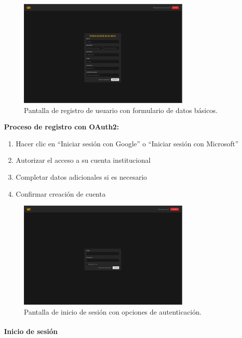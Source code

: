 \begin{figure}[H]
	\centering
	\includegraphics[width=0.75\textwidth]{images/pagina_web_registro.png}
	\caption{Pantalla de registro de usuario con formulario de datos básicos.}
	\label{fig:manual-registro}
\end{figure}

\textbf{Proceso de registro con OAuth2:}

\begin{enumerate}
	\item Hacer clic en ``Iniciar sesión con Google'' o ``Iniciar sesión con Microsoft''
	\item Autorizar el acceso a su cuenta institucional
	\item Completar datos adicionales si es necesario
	\item Confirmar creación de cuenta
\end{enumerate}

\begin{figure}[H]
	\centering
	\includegraphics[width=0.75\textwidth]{images/pagina_web_iniciar-sesion.png}
	\caption{Pantalla de inicio de sesión con opciones de autenticación.}
	\label{fig:manual-login}
\end{figure}

\paragraph{Inicio de sesión}

